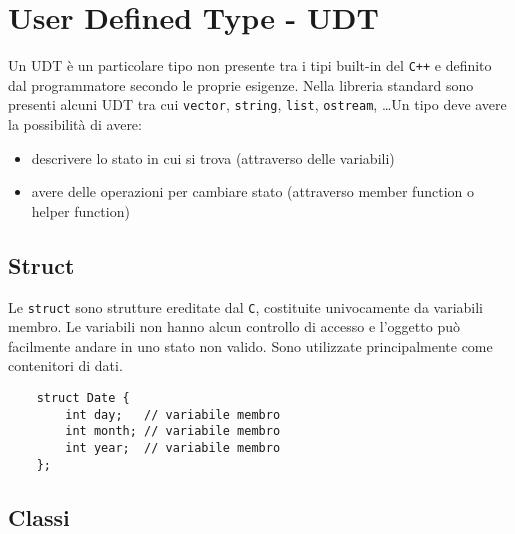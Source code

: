 \documentclass[a4paper]{article}
\begin{document}
\newpage

\section{User Defined Type - UDT}
Un UDT è un particolare tipo non presente tra i tipi built-in del \verb|C++| e definito dal programmatore secondo le proprie esigenze.
Nella libreria standard sono presenti alcuni UDT tra cui \verb|vector|, \verb|string|, \verb|list|, \verb|ostream|, \dots Un tipo
deve avere la possibilità di avere:
\begin{itemize}[topsep=0pt]
	\item descrivere lo stato in cui si trova (attraverso delle variabili)
	\item avere delle operazioni per cambiare stato (attraverso member function o helper function)
\end{itemize}

\subsection{Struct}
Le \verb|struct| sono strutture ereditate dal \verb|C|, costituite univocamente da variabili membro. Le variabili non hanno alcun
controllo di accesso e l'oggetto può facilmente andare in uno stato non valido. Sono utilizzate principalmente come contenitori
di dati.
\begin{lstlisting}
	struct Date {
		int day;   // variabile membro
		int month; // variabile membro
		int year;  // variabile membro
	};
\end{lstlisting}

\subsection{Classi}
\end{document}

